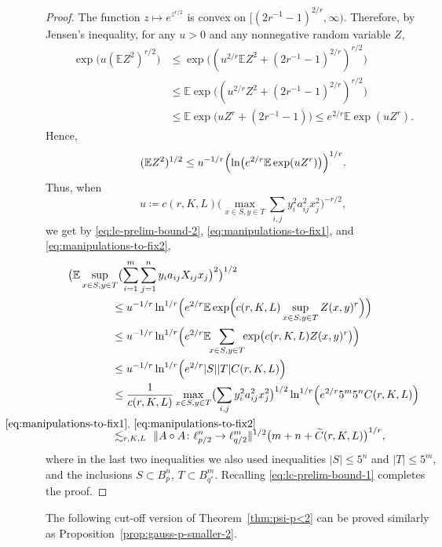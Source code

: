 \documentclass[a4paper]{amsart}
\theoremstyle{definition}
\theoremstyle{remark}
\numberwithin{equation}{section}
\newcommand*{\EE}{\mathbb{E}}
\newcommand*{\hadprod}{\mathbin{\circ}} %
\begin{document}
\begin{proof}
	The function $z\mapsto e^{z^{r/2}}$ is convex on $[(2r^{-1}-1)^{2/r},\infty)$. Therefore,
	by Jensen's inequality, for any $u> 0$ and any nonnegative random variable $Z$,
	\begin{align*}
	\exp\bigl(u (\EE Z^2)^{r/2}\bigr)
	&\leq \exp\bigl( (u^{2/r}\EE Z^2 + (2r^{-1}-1)^{2/r})^{r/2}\bigr)\\
	&\leq \EE 	 \exp\bigl( (u^{2/r} Z^2 + (2r^{-1}-1)^{2/r})^{r/2}\bigr)\\
	&\leq \EE 	 \exp\bigl( u Z^r + (2r^{-1}-1) \bigr) \leq  e^{2/r} \EE \exp(u Z^r).
	\end{align*}
	Hence,
	\[
    (\EE Z^2)^{1/2} \le u^{-1/r} \Bigl(\ln \bigl(e^{2/r} \EE \exp(u Z^{r})\bigr)\Bigr)^{1/r}.
	\]
	Thus, when
	\[	
		u\coloneqq c(r,K,L) \bigl(\max_{x\in S, y\in T} \sum_{i,j} y_i^2a_{ij}^2x_j^2 \bigr)^{-r/2},
	\]
	 we get by \eqref{eq:lc-prelim-bound-2}, \eqref{eq:manipulations-to-fix1}, and \eqref{eq:manipulations-to-fix2},
	\begin{align*}
		\MoveEqLeft[4]
		\bigl(\EE \sup_{x\in S, y\in T}  \bigl(\sum_{i=1}^m \sum_{j=1}^n  y_i a_{ij} X_{ij} x_j\bigr)^2\bigr)^{1/2} \\
		&\leq u^{-1/r} \ln^{1/r} \Bigl(e^{2/r}\EE \exp\Bigl( c(r,K,L) \sup_{x\in S, y\in T}Z(x,y)^{r}\Bigr)\Bigr) \\
		&\leq u^{-1/r} \ln^{1/r} \Bigl(e^{2/r}\EE \!\!  \sum_{x\in S, y\in T}\!\! \exp\bigl( c(r,K,L) Z(x,y)^{r}\bigr)\Bigr) \\
		&\leq u^{-1/r} \ln^{1/r} \Bigl(e^{2/r}|S||T|  C(r,K,L)\Bigr)  \\
		&\leq \frac 1{c(r,K,L)} \max_{x\in S, y\in T}\bigl( \sum_{i,j} y_i^2a_{ij}^2x_j^2 \bigr)^{1/2} \ln^{1/r} \Bigl(e^{2/r} 5^{m} 5^{n} C(r,K,L)\Bigr) \\
		 & \overset{\mathclap{\eqref{eq:manipulations-to-fix1},\ \eqref{eq:manipulations-to-fix2}}}{\lesssim_{r,K,L}} \ \|A\hadprod A \colon \ell^n_{p/2} \to \ell^m_{q/2} \|^{1/2} \bigl(m+n+ \widetilde{C}(r,K,L)\bigr)^{1/r},
	\end{align*}
	where in the last two inequalities we also used inequalities $|S| \leq 5^n$ and $|T|\leq 5^m$, and the inclusions $S\subset B_p^n$, $T\subset B_{q^*}^m$.
    	Recalling \eqref{eq:lc-prelim-bound-1} completes the proof.
\end{proof}


The following cut-off version of Theorem~\ref{thm:psi-p<2}
can be proved similarly as  Proposition~\ref{prop:gauss-p-smaller-2}.
\end{document}
